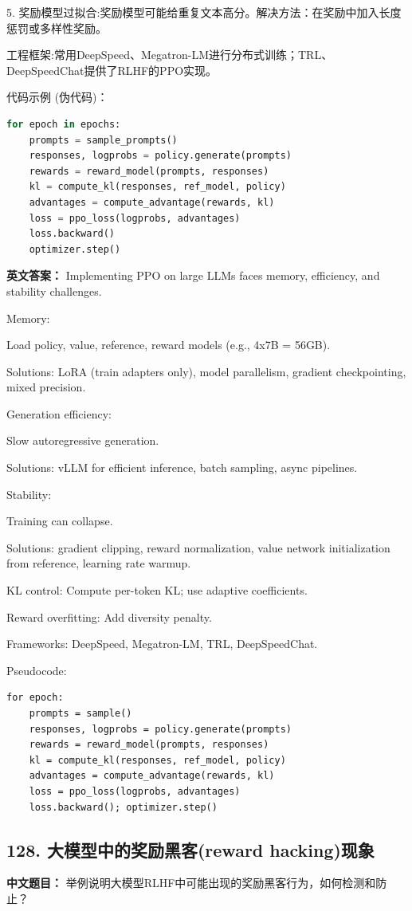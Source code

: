\documentclass[10pt,a4paper]{ctexart}
\begin{document}
5.  奖励模型过拟合:奖励模型可能给重复文本高分。解决方法：在奖励中加入长度惩罚或多样性奖励。

 工程框架:常用DeepSpeed、Megatron-LM进行分布式训练；TRL、DeepSpeedChat提供了RLHF的PPO实现。

 代码示例 (伪代码)：
\begin{lstlisting}[language=Python]
for epoch in epochs:
    prompts = sample_prompts()
    responses, logprobs = policy.generate(prompts)
    rewards = reward_model(prompts, responses)
    kl = compute_kl(responses, ref_model, policy)
    advantages = compute_advantage(rewards, kl)
    loss = ppo_loss(logprobs, advantages)
    loss.backward()
    optimizer.step()
\end{lstlisting}


\textbf{英文答案：}
Implementing PPO on large LLMs faces memory, efficiency, and stability challenges.

Memory:

Load policy, value, reference, reward models (e.g., 4x7B = 56GB).

Solutions: LoRA (train adapters only), model parallelism, gradient checkpointing, mixed precision.

Generation efficiency:

Slow autoregressive generation.

Solutions: vLLM for efficient inference, batch sampling, async pipelines.

Stability:

Training can collapse.

Solutions: gradient clipping, reward normalization, value network initialization from reference, learning rate warmup.

KL control: Compute per-token KL; use adaptive coefficients.

Reward overfitting: Add diversity penalty.

Frameworks: DeepSpeed, Megatron-LM, TRL, DeepSpeedChat.

Pseudocode:
\begin{lstlisting}
for epoch:
    prompts = sample()
    responses, logprobs = policy.generate(prompts)
    rewards = reward_model(prompts, responses)
    kl = compute_kl(responses, ref_model, policy)
    advantages = compute_advantage(rewards, kl)
    loss = ppo_loss(logprobs, advantages)
    loss.backward(); optimizer.step()
\end{lstlisting}
\subsection*{128. 大模型中的奖励黑客(reward hacking)现象}
\textbf{中文题目：} 举例说明大模型RLHF中可能出现的奖励黑客行为，如何检测和防止？
\end{document}
